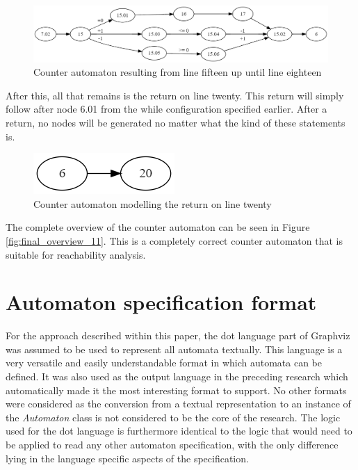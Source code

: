 \documentclass[12pt]{thesis}
\begin{document}
\begin{figure}[h]
	\centering
	\includegraphics[width=\linewidth]{final_overview_9}
	\caption{Counter automaton resulting from line fifteen up until line eighteen}
	\label{fig:final_overview_9}
\end{figure}

After this, all that remains is the return on line twenty. This return will simply follow after node 6.01 from the while configuration specified earlier. After a return, no nodes will be generated no matter what the kind of these statements is.

\begin{figure}[h]
	\centering
	\includegraphics[width=0.35\linewidth]{final_overview_10}
	\caption{Counter automaton modelling the return on line twenty}
	\label{fig:final_overview_10}
\end{figure}

The complete overview of the counter automaton can be seen in Figure \ref{fig:final_overview_11}. This is a completely correct counter automaton that is suitable for reachability analysis.

\section{Automaton specification format}
\label{sec:automaton input}
For the approach described within this paper, the dot language part of Graphviz\cite{10.1007/3-540-45848-4_57} was assumed to be used to represent all automata textually. This language is a very versatile and easily understandable format in which automata can be defined. It was also used as the output language in the preceding research which automatically made it the most interesting format to support. No other formats were considered as the conversion from a textual representation to an instance of the \textit{Automaton} class is not considered to be the core of the research. The logic used for the dot language is furthermore identical to the logic that would need to be applied to read any other automaton specification, with the only difference lying in the language specific aspects of the specification.
\end{document}
